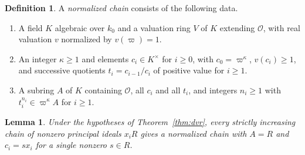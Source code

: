 \documentclass[11pt, letterpaper]{article}
\newtheorem{lemma}[theorem]{Lemma}
\theoremstyle{definition}
\newtheorem{definition}[theorem]{Definition}
\theoremstyle{remark}
\begin{document}
\begin{definition}
    \label{hyp:M}
    A \emph{normalized chain} consists of the following data.
    \begin{enumerate}
        \item A field $K$ algebraic over $k_{0}$ and a valuation ring $V$ of $K$ extending $\mathcal{O}$, with real valuation $v$ normalized by $v(\varpi) = 1$.
        \item An integer $\kappa \ge 1$ and elements $c_{i} \in K^{\times}$ for $i \ge 0$, with $c_{0} = \varpi^{\kappa}$, $v(c_{i}) \ge 1$, and successive quotients $t_{i} = c_{i - 1}/c_{i}$ of positive value for $i \ge 1$.
        \item A subring $A$ of $K$ containing $\mathcal{O}$, all $c_{i}$ and all $t_{i}$, and integers $n_{i} \ge 1$ with $t_{i}^{n_{i}} \in \varpi^{\kappa} A$ for $i \ge 1$.
    \end{enumerate}
\end{definition}

\begin{lemma}
    \label{lem:normalize}
    Under the hypotheses of Theorem~\ref{thm:dvr}, every strictly increasing chain of nonzero principal ideals $x_{i}R$ gives a normalized chain with $A = R$ and $c_{i} = sx_{i}$ for a single nonzero $s \in R$.
\end{lemma}
\end{document}
